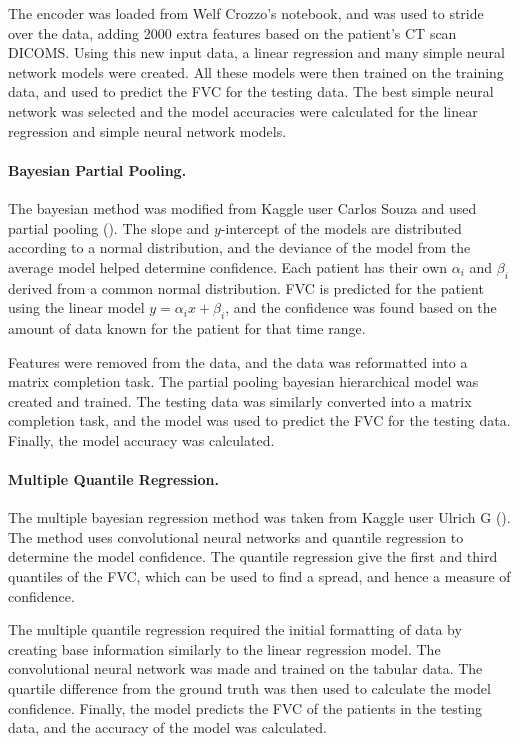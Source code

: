 \documentclass[12pt]{article}
\begin{document}
The encoder was loaded from Welf Crozzo's notebook, and was used to stride over the data, adding 2000 extra features based on the patient's CT scan DICOMS.
Using this new input data, a linear regression and many simple neural network models were created.
All these models were then trained on the training data, and used to predict the FVC for the testing data.
The best simple neural network was selected and the model accuracies were calculated for the linear regression and simple neural network models.

\paragraph*{Bayesian Partial Pooling.}

The bayesian method was modified from Kaggle user Carlos Souza and used partial pooling (\cite{bayesian}). 
The slope and $y$-intercept of the models are distributed according to a normal distribution, and the deviance of the model from the average model helped determine confidence. 
Each patient has their own $\alpha_i$ and $\beta_i$ derived from a common normal distribution.
FVC is predicted for the patient using the linear model $y = \alpha_i x + \beta_i$, and the confidence was found based on the amount of data known for the patient for that time range.

Features were removed from the data, and the data was reformatted into a matrix completion task.
The partial pooling bayesian hierarchical model was created and trained.
The testing data was similarly converted into a matrix completion task, and the model was used to predict the FVC for the testing data.
Finally, the model accuracy was calculated.

\paragraph*{Multiple Quantile Regression.}

The multiple bayesian regression method was taken from Kaggle user Ulrich G (\cite{multiplequantile}). 
The method uses convolutional neural networks and quantile regression to determine the model confidence. 
The quantile regression give the first and third quantiles of the FVC, which can be used to find a spread, and hence a measure of confidence. 

The multiple quantile regression required the initial formatting of data by creating base information similarly to the linear regression model.
The convolutional neural network was made and trained on the tabular data.
The quartile difference from the ground truth was then used to calculate the model confidence.
Finally, the model predicts the FVC of the patients in the testing data, and the accuracy of the model was calculated.
\end{document}
